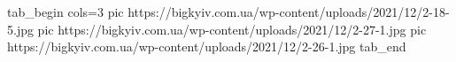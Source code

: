  
 
 
 
 

\ifcmt
  tab_begin cols=3
     pic https://bigkyiv.com.ua/wp-content/uploads/2021/12/2-18-5.jpg
     pic https://bigkyiv.com.ua/wp-content/uploads/2021/12/2-27-1.jpg
		 pic https://bigkyiv.com.ua/wp-content/uploads/2021/12/2-26-1.jpg
  tab_end
\fi
